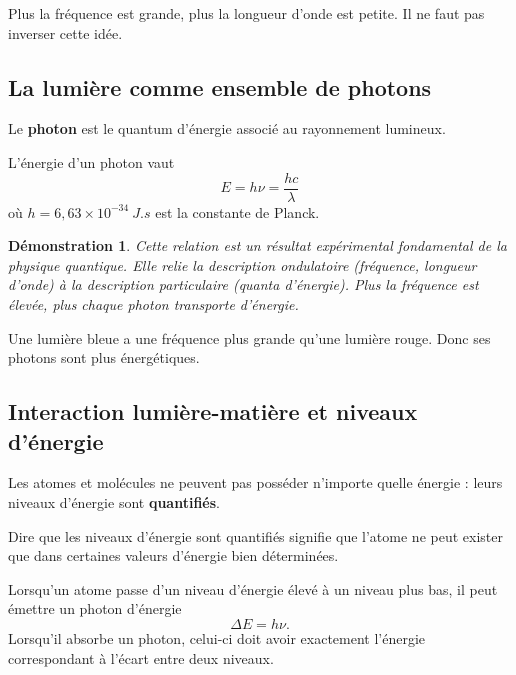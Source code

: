 \documentclass[11pt,a4paper]{article}
\newtheorem*{demonstration}{Démonstration}
\begin{document}
\begin{attentionbox}
Plus la fréquence est grande, plus la longueur d'onde est petite. Il ne faut pas inverser cette idée.
\end{attentionbox}

\subsection{La lumière comme ensemble de photons}

\begin{definitionbox}
Le \textbf{photon} est le quantum d'énergie associé au rayonnement lumineux.
\end{definitionbox}

\begin{propriete}
L'énergie d'un photon vaut
\[
E = h\nu = \frac{hc}{\lambda}
\]
où $h=6{,}63\times 10^{-34}\ \si{J.s}$ est la constante de Planck.
\end{propriete}

\begin{demonstration}
Cette relation est un résultat expérimental fondamental de la physique quantique. Elle relie la description ondulatoire (fréquence, longueur d'onde) à la description particulaire (quanta d'énergie). Plus la fréquence est élevée, plus chaque photon transporte d'énergie.
\end{demonstration}

\begin{exemplebox}
Une lumière bleue a une fréquence plus grande qu'une lumière rouge. Donc ses photons sont plus énergétiques.
\end{exemplebox}

\subsection{Interaction lumière-matière et niveaux d'énergie}
Les atomes et molécules ne peuvent pas posséder n'importe quelle énergie : leurs niveaux d'énergie sont \textbf{quantifiés}.

\begin{definitionbox}
Dire que les niveaux d'énergie sont quantifiés signifie que l'atome ne peut exister que dans certaines valeurs d'énergie bien déterminées.
\end{definitionbox}

\begin{propriete}
Lorsqu'un atome passe d'un niveau d'énergie élevé à un niveau plus bas, il peut émettre un photon d'énergie
\[
\Delta E = h\nu.
\]
Lorsqu'il absorbe un photon, celui-ci doit avoir exactement l'énergie correspondant à l'écart entre deux niveaux.
\end{propriete}
\end{document}
